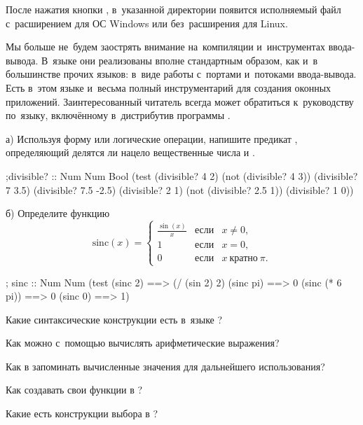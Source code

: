 После нажатия кнопки , в~указанной директории появится исполняемый файл с~расширением  для ОС Windows или без~расширения для Linux.

Мы больше не~будем заострять внимание на~компиляции и~инструментах ввода-вывода. В~языке \Scheme они реализованы вполне стандартным образом, как и~в большинстве прочих языков: в~виде работы с~портами и~потоками ввода-вывода. Есть в~этом языке и~весьма полный инструментарий для создания оконных приложений. Заинтересованный читатель всегда может обратиться к~руководству по~языку, включённому в~дистрибутив программы .

\begin{Assignment}
а) Используя форму  или логические операции, напишите предикат , определяющий делятся ли нацело вещественные числа  и . 

\begin{Specification}
;divisible? :: Num Num \arrow Bool
(test
  (divisible? 4 2)
  (not (divisible? 4 3))
  (divisible? 7 3.5)
  (divisible? 7.5 -2.5)
  (divisible? 2 1)
  (not (divisible? 2.5 1))
  (divisible? 1 0))
\end{Specification}

б) Определите функцию 
\begin{equation*}
\mathrm{sinc}(x) = \left\{
\begin{array}{lll}
  \frac{\sin(x)}{x} &\text{если}& x \neq 0,\\
  1 &\text{если}& x = 0,\\
  0 &\text{если}& x~\text{кратно}~\pi.
\end{array}\right. 
\end{equation*}
 
\begin{Specification}
; sinc :: Num \arrow Num
(test
  (sinc 2)        ==> (/ (sin 2) 2)
  (sinc pi)       ==> 0
  (sinc (* 6 pi)) ==> 0
  (sinc 0)        ==> 1)
\end{Specification}
\end{Assignment}

\newpage
\begin{Queeze}
 \item Какие синтаксические конструкции есть в~языке \Scheme?

 \item Как можно с~помощью \Scheme вычислять арифметические выражения?

 \item Как в \Scheme запоминать вычисленные значения для дальнейшего использования?

 \item Как создавать свои функции в \Scheme?

 \item Какие есть конструкции выбора в \Scheme?
\end{Queeze}

